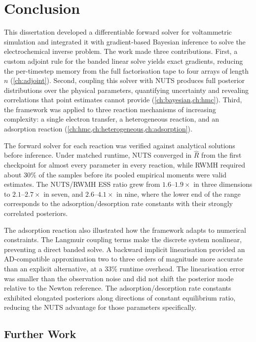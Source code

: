 \chapter{Conclusion}\label{ch:conclusions}

This dissertation developed a differentiable forward solver for
voltammetric simulation and integrated it with gradient-based Bayesian
inference to solve the electrochemical inverse problem. The work made
three contributions. First, a custom adjoint rule for the banded
linear solve yields exact gradients, reducing the per-timestep memory
from the full factorisation tape to four arrays of length~$n$
(\cref{ch:adjoint}). Second, coupling this solver with NUTS produces
full posterior distributions over the physical parameters, quantifying
uncertainty and revealing correlations that point estimates cannot
provide (\cref{ch:bayesian,ch:hmc}). Third, the framework was applied
to three reaction mechanisms of increasing complexity: a single
electron transfer, a heterogeneous reaction, and an adsorption
reaction (\cref{ch:hmc,ch:heterogeneous,ch:adsorption}).

The forward solver for each reaction was verified against analytical
solutions before inference. Under matched runtime, NUTS converged in
$\hat{R}$ from the first checkpoint for almost every parameter in every
reaction, while RWMH required about $30\%$ of the samples before its
pooled empirical moments were valid estimates. The NUTS/RWMH ESS ratio grew from
$1.6$--$1.9\times$ in three dimensions to $2.1$--$2.7\times$ in
seven, and $2.6$--$4.1\times$ in nine, where the lower end
of the range corresponds to the adsorption/desorption rate constants
with their strongly correlated posteriors.

The adsorption reaction also illustrated how the framework adapts to
numerical constraints. The Langmuir coupling terms make the discrete
system nonlinear, preventing a direct banded solve. A backward implicit
linearisation provided an AD-compatible approximation two to three
orders of magnitude more accurate than an explicit alternative, at a
33\% runtime overhead. The linearisation error was smaller than the
observation noise and did not shift the posterior mode relative to the
Newton reference. The adsorption/desorption rate constants
exhibited elongated posteriors along directions of constant equilibrium
ratio, reducing the NUTS advantage for those parameters specifically.

\section{Further Work}\label{sec:further-work}

